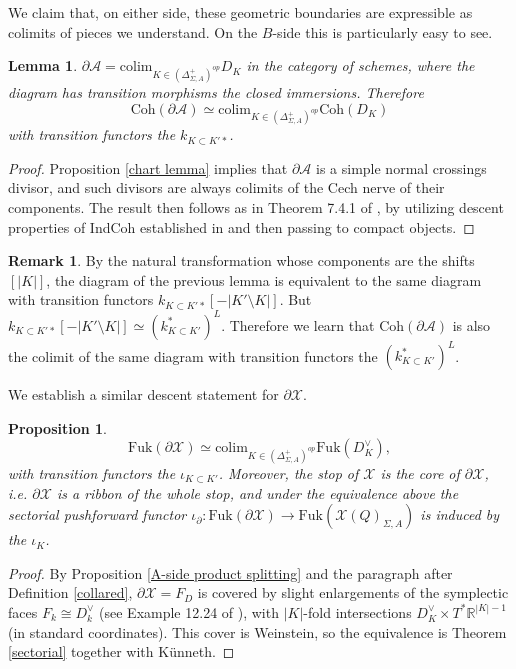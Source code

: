 \documentclass[11pt]{amsart}
\newtheorem{prop}[thm]{Proposition}
\newtheorem{lem}[thm]{Lemma}
\theoremstyle{definition}
\newtheorem{rem}[thm]{Remark}
\theoremstyle{remark}
\newcommand{\A}{\mathcal{A}}
\newcommand{\X}{\mathcal{X}}
\newcommand{\colim}{\mathrm{colim}}
\newcommand{\Coh}{\mathrm{Coh}}
\newcommand{\Fuk}{\mathrm{Fuk}}
\numberwithin{equation}{section}
\begin{document}
We claim that, on either side, these geometric boundaries are expressible as colimits of pieces we understand. On the $B$-side this is particularly easy to see.

\begin{lem}\label{colim B-side}
$\partial \A = \colim_{K \in (\Delta_{\Sigma, A}^+)^{op}} D_K$ in the category of schemes, where the diagram has transition morphisms the closed immersions. Therefore
    $$\Coh(\partial \A) \simeq \colim_{K \in (\Delta_{\Sigma, A}^+)^{op}} \Coh(D_K)$$ \noindent with transition functors the $k_{K \subset K' *}$.
\end{lem}

\begin{proof}
    Proposition \ref{chart lemma} implies that $\partial \A$ is a simple normal crossings divisor, and such divisors are always colimits of the Cech nerve of their components. The result then follows as in Theorem 7.4.1 of \cite{gammage2022mirror}, by utilizing descent properties of IndCoh established in \cite{GR} and then passing to compact objects.
\end{proof}

\begin{rem}
  By the natural transformation whose components are the shifts $[\lvert K\rvert]$, the diagram of the previous lemma is equivalent to the same diagram with transition functors $k_{K\subset K'*}[-| K'\setminus K|]$. But $k_{K \subset K' *}[-|K' \setminus K|] \simeq (k^*_{K \subset K'})^L$. Therefore we learn that $\Coh(\partial \A)$ is also the colimit of the same diagram with transition functors the $(k^*_{K \subset K'})^L$.
\end{rem}

We establish a similar descent statement for $\partial \X$.

\begin{prop}\label{prop:ribbon}
$$\Fuk(\partial \X)\simeq \colim_{K \in (\Delta^+_{\Sigma,A})^{op}}\Fuk(D_K^\vee),$$ with transition functors the $\iota_{K\subset K'}$.
Moreover, the stop of $\X$ is the core of $\partial \X$, i.e. $\partial \X$ is a ribbon of the whole stop, and under the equivalence above the sectorial pushforward functor $\iota_\partial: \Fuk(\partial \X)\to \Fuk(\X(Q)_{\Sigma,A})$ is induced by the $\iota_K$.
\end{prop}
 
\begin{proof}
By Proposition \ref{A-side product splitting} and the paragraph after Definition \ref{collared}, $\partial\mathcal X=F_D$ is covered by slight enlargements of the symplectic faces $F_k\cong D^\vee_k$ (see Example 12.24 of \cite{GPSI}), with $|K|$-fold intersections $D^\vee_K\times T^*\mathbb R^{|K|-1}$ (in standard coordinates). This cover is Weinstein, so the equivalence is Theorem \ref{sectorial} together with K\"{u}nneth.
\end{proof}
\end{document}
